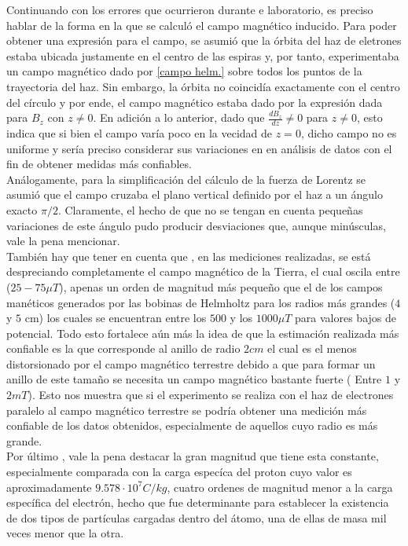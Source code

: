 \documentclass[prb,aps,twocolumn,preprintnumbers,amsmath,amssymb]{revtex4}
\begin{document}
Continuando con los errores que ocurrieron durante e laboratorio, es preciso hablar de la forma en la que se calculó el campo magnético inducido. Para poder obtener una expresión para el campo, se asumió que la órbita del haz de eletrones estaba ubicada justamente en el centro de las espiras y, por tanto, experimentaba un campo magnético dado por \eqref{campo helm.} sobre todos los puntos de la trayectoria del haz. Sin embargo, la órbita no coincidía exactamente con el centro del círculo y por ende, el campo magnético estaba dado por la expresión dada para $B_{z}$ con $z \neq 0$. En adición a lo anterior, dado que $\frac{dB_{z}}{dz} \neq 0$ para $z \neq 0$, esto indica que si bien el campo varía poco en la vecidad de $z = 0$, dicho campo no es uniforme y sería preciso considerar sus variaciones en en análisis de datos con el fin de obtener medidas más confiables.\\  


Análogamente, para la simplificación del cálculo de la fuerza de Lorentz se asumió que el campo cruzaba el plano vertical definido por el haz a un ángulo exacto $ \pi /2 $. Claramente, el hecho de que no se tengan en cuenta pequeñas variaciones de este ángulo pudo producir desviaciones que, aunque minúsculas, vale la pena mencionar. \\

También hay que tener en cuenta que , en las mediciones realizadas, se está despreciando completamente el campo magnético de la Tierra, el cual oscila entre ($25-75 \mu T$), apenas un orden de magnitud más pequeño que el de los campos manéticos generados por las bobinas de Helmholtz para los radios más grandes ($4$ y $5$ cm) los cuales se encuentran entre los $500$ y los $1000 \mu T$ para valores bajos de potencial. Todo esto fortalece aún más la idea de que la estimación realizada más confiable es la que corresponde al anillo de radio $2cm$ el cual  es el menos distorsionado por el campo magnético terrestre debido a que para formar un anillo de este tamaño se necesita un campo magnético bastante fuerte ( Entre $1$ y $2 mT$). Esto nos muestra que si el experimento se realiza con el haz de electrones paralelo al campo magnético terrestre se podría obtener una medición más confiable de los datos obtenidos, especialmente de aquellos cuyo radio es más grande. \\

Por último , vale la pena destacar la gran magnitud que tiene esta constante, especialmente comparada con la carga especíca del proton cuyo valor es aproximadamente $9.578 \cdot 10^7 C/kg$, cuatro ordenes de magnitud menor a la carga específica del electrón, hecho que fue determinante para establecer la existencia de dos tipos de partículas cargadas dentro del átomo, una de ellas de masa mil veces menor que la otra.\\
\end{document}
